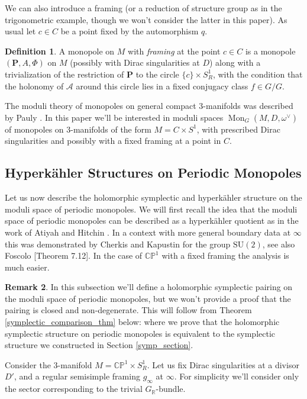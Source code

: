 \documentclass[11pt, oneside, reqno]{amsart}
\theoremstyle{definition} \newtheorem{definition}{Definition}[section]
\theoremstyle{definition} \newtheorem{remark}[definition]{Remark}
\theoremstyle{definition} \newtheorem{remarks}[definition]{Remarks}
\theoremstyle{definition} \newtheorem{question}[definition]{Question}
\theoremstyle{definition} \newtheorem*{note}{Note}
\theoremstyle{definition} \newtheorem{example}[definition]{Example}
\theoremstyle{definition} \newtheorem{examples}[definition]{Examples}
\newcommand{\bb}[1]{\mathbb{#1}}
\newcommand{\mc}[1]{\mathcal{#1}}
\newcommand{\bo}[1]{\boldsymbol{#1}}
\newcommand{\RR}{\mathbb{R}}
\newcommand{\SU}{\mathrm{SU}}
\DeclareMathOperator{\mon}{Mon}
\begin{document}
We can also introduce a framing (or a reduction of structure group as in the trigonometric example, though we won't consider the latter in this paper).  As usual let $c \in C$ be a point fixed by the automorphism $q$.

\begin{definition}
A monopole on $M$ with \emph{framing} at the point $c \in C$ is a monopole $(\bo P,A,\Phi)$ on $M$ (possibly with Dirac singularities at $D$) along with a trivialization of the restriction of $\bo P$ to the circle $\{c\} \times S^1_R$, with the condition that the holonomy of $\mc A$ around this circle lies in a fixed conjugacy class $f \in G/G$.
\end{definition}

The moduli theory of monopoles on general compact 3-manifolds was described by Pauly \cite{Pauly}.  In this paper we'll be interested in moduli spaces $\mon_G(M, D, \omega^\vee)$ of monopoles on 3-manifolds of the form $M = C \times S^1$, with prescribed Dirac singularities and possibly with a fixed framing at a point in $C$.  

\subsection{Hyperk\"ahler Structures on Periodic Monopoles} \label{HK_monopole_section}
Let us now describe the holomorphic symplectic and hyperk\"ahler structure on the moduli space of periodic monopoles.  We will first recall the idea that the moduli space of periodic monopoles can be described as a hyperk\"ahler quotient as in the work of Atiyah and Hitchin \cite{AtiyahHitchin}.  In a context with more general boundary data at $\infty$ this was demonstrated by Cherkis and Kapustin \cite{CherkisKapustin3} for the group $\SU(2)$, see also Foscolo \cite{FoscoloDef}[Theorem 7.12].  In the case of $\bb{CP}^1$ with a fixed framing the analysis is much easier.

\begin{remark}
In this subsection we'll define a holomorphic symplectic pairing on the moduli space of periodic monopoles, but we won't provide a proof that the pairing is closed and non-degenerate.  This will follow from Theorem \ref{symplectic_comparison_thm} below: where we prove that the holomorphic symplectic structure on periodic monopoles is equivalent to the symplectic structure we constructed in Section \ref{symp_section}.
\end{remark}

Consider the 3-manifold $M = \bb{CP}^1 \times S^1_R$.  Let us fix Dirac singularities at a divisor $D'$, and a regular semisimple framing $g_\infty$ at $\infty$.  For simplicity we'll consider only the sector corresponding to the trivial $G_\RR$-bundle.
\end{document}
